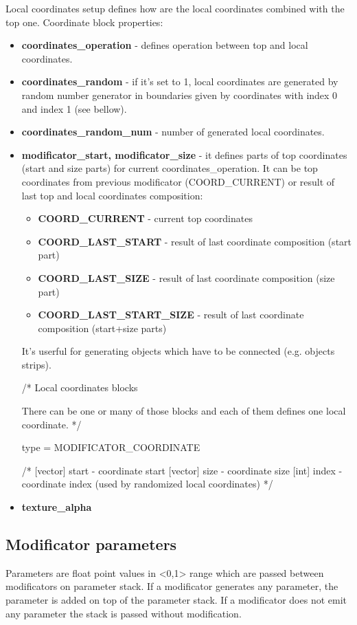 \documentclass[9pt]{article}
\begin{document}
Local coordinates setup defines how are the local 
coordinates combined with the top one.
Coordinate block properties:
\begin{itemize}
\item{\bf coordinates\_operation} - defines operation between top and local coordinates.
\item{\bf coordinates\_random} - if it's set to 1, local coordinates are generated by random number
generator in boundaries given by coordinates with index 0 and index 1 (see bellow).
\item{\bf coordinates\_random\_num} - number of generated local coordinates.    
\item{\bf modificator\_start, modificator\_size} - it defines parts of top 
coordinates (start and size parts) for current coordinates\_operation. 
It can be top coordinates from previous modificator (COORD\_CURRENT) or 
result of last top and local coordinates composition:
\begin{itemize}
\item{\bf COORD\_CURRENT} - current top coordinates
\item{\bf COORD\_LAST\_START} - result of last coordinate composition (start part)
\item{\bf COORD\_LAST\_SIZE} - result of last coordinate composition (size part)
\item{\bf COORD\_LAST\_START\_SIZE} - result of last coordinate composition (start+size parts)
\end{itemize}
It's userful for generating objects which have to be connected (e.g. objects strips).
  
  /*
    Local coordinates blocks
    
    There can be one or many of those blocks and each of them defines
    one local coordinate.
  */
  {
    type = MODIFICATOR\_COORDINATE
    
    /*
      [vector] start  - coordinate start
      [vector] size   - coordinate size
      [int]    index  - coordinate index (used by randomized local coordinates)
    */
  }

\item{\bf texture\_alpha}
\end{itemize}

\subsection{Modificator parameters}

Parameters are float point values in <0,1> range which are passed between
modificators on parameter stack. If a modificator generates any parameter, the
parameter is added on top of the parameter stack. If a modificator does not
emit any parameter the stack is passed without modification.
\end{document}

